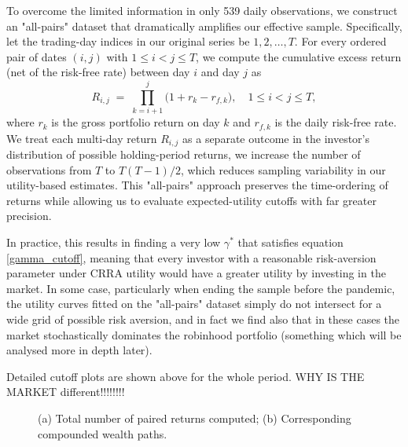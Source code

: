 To overcome the limited information in only 539 daily observations, we construct an "all-pairs" dataset that dramatically amplifies our effective sample.  
Specifically, let the trading-day indices in our original series be $1,2,\dots,T$.  
For every ordered pair of dates $(i,j)$ with $1 \le i < j \le T$, we compute the cumulative excess return (net of the risk-free rate) between day $i$ and day $j$ as
\begin{equation}
    R_{i,j}
    \;=\;
    \prod_{k=i+1}^{j}\bigl(1 + r_k - r_{f,k}\bigr),
    \quad
    1 \le i < j \le T,
    \label{eq:allpairs_return}
\end{equation}
where $r_k$ is the gross portfolio return on day $k$ and $r_{f,k}$ is the daily risk-free rate.  
We treat each multi-day return $R_{i,j}$ as a separate outcome in the investor's distribution of possible holding-period returns, we increase the number of observations from $T$ to $T(T-1)/2$, which reduces sampling variability in our utility-based estimates.  
This "all-pairs" approach preserves the time-ordering of returns while allowing us to evaluate expected-utility cutoffs with far greater precision.  

In practice, this results in finding a very low $\gamma^*$ that satisfies equation \ref{gamma_cutoff}, meaning that every investor with a reasonable risk-aversion parameter under CRRA utility would have a greater utility by investing in the market.
In some case, particularly when ending the sample before the pandemic, the utility curves fitted on the "all-pairs" dataset simply do not intersect for a wide grid of possible risk aversion,
and in fact we find also that in these cases the market stochastically dominates the robinhood portfolio (something which will be analysed more in depth later).

Detailed cutoff plots are shown above for the whole period.
WHY IS THE MARKET different!!!!!!!!

\begin{figure}[h!]
  \centering
  \hfill
  \caption{(a) Total number of paired returns computed; (b) Corresponding compounded wealth paths.}
  \label{fig:cutoff_all_sidebyside}
\end{figure}
